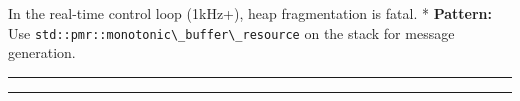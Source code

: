 In the real-time control loop (1kHz+), heap fragmentation is fatal. *
\textbf{Pattern:} Use
\passthrough{\lstinline!std::pmr::monotonic\_buffer\_resource!} on the
stack for message generation.

\begin{center}\rule{0.5\linewidth}{0.5pt}\end{center}

\begin{center}\rule{0.5\linewidth}{0.5pt}\end{center}
